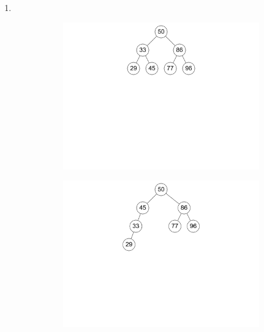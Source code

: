 \documentclass[11pt,a4paper]{article}
\begin{document}
\begin{loesung}
\begin{enumerate}
        \item \ \\
        \begin{figure}[h!]
            \centering
            \begin{subfigure}[b]{0.3\textwidth}
                \centering
                \includegraphics[width=\textwidth]{img/2c_1}
            \end{subfigure}
            \begin{subfigure}[b]{0.3\textwidth}
                \centering
                \includegraphics[width=\textwidth]{img/2c_2}
            \end{subfigure}
            \begin{subfigure}[b]{0.3\textwidth}

\end{subfigure}
\end{figure}
\end{enumerate}
\end{loesung}
\end{document}
